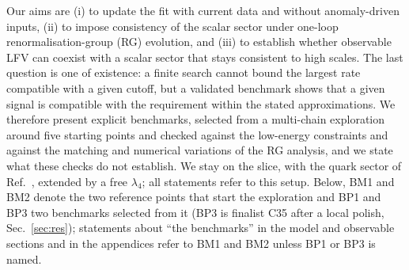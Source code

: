 \documentclass[twocolumn,epjc3]{svjour3}
\newcommand{\HG}{Ref.~\cite{HerreroGarcia:2017xdq}}
\begin{document}
Our aims are (i) to update the fit with current data and without anomaly-driven inputs, (ii) to impose consistency of the scalar sector under one-loop renormalisation-group (RG) evolution, and (iii) to establish whether observable LFV can coexist with a scalar sector that stays consistent to high scales. The last question is one of existence: a finite search cannot bound the largest rate compatible with a given cutoff, but a validated benchmark shows that a given signal is compatible with the requirement within the stated approximations. We therefore present explicit benchmarks, selected from a multi-chain exploration around five starting points and checked against the low-energy constraints and against the matching and numerical variations of the RG analysis, and we state what these checks do not establish. We stay on the slice, with the quark sector of \HG{}, extended by a free $\lambda_4$; all statements refer to this setup. Below, BM1 and BM2 denote the two reference points that start the exploration and BP1 and BP3 two benchmarks selected from it (BP3 is finalist C35 after a local polish, Sec.~\ref{sec:res}); statements about ``the benchmarks'' in the model and observable sections and in the appendices refer to BM1 and BM2 unless BP1 or BP3 is named.
\end{document}
